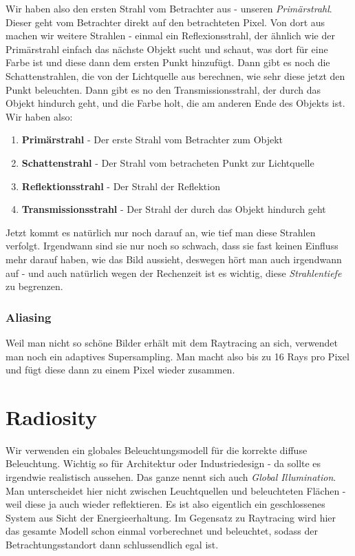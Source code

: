 Wir haben also den ersten Strahl vom Betrachter aus - unseren \textit{Primärstrahl}. Dieser geht vom Betrachter direkt auf den betrachteten Pixel. Von dort aus machen wir weitere Strahlen - einmal ein Reflexionsstrahl, der ähnlich wie der Primärstrahl einfach das nächste Objekt sucht und schaut, was dort für eine Farbe ist und diese dann dem ersten Punkt hinzufügt. Dann gibt es noch die Schattenstrahlen, die von der Lichtquelle aus berechnen, wie sehr diese jetzt den Punkt beleuchten. Dann gibt es no den Transmissionsstrahl, der durch das Objekt hindurch geht, und die Farbe holt, die am anderen Ende des Objekts ist. Wir haben also:
\begin{enumerate}
	\item \textbf{Primärstrahl} - Der erste Strahl vom Betrachter zum Objekt
	\item \textbf{Schattenstrahl} - Der Strahl vom betracheten Punkt zur Lichtquelle
	\item \textbf{Reflektionsstrahl} - Der Strahl der Reflektion
	\item \textbf{Transmissionsstrahl} - Der Strahl der durch das Objekt hindurch geht
\end{enumerate}

Jetzt kommt es natürlich nur noch darauf an, wie tief man diese Strahlen verfolgt. Irgendwann sind sie nur noch so schwach, dass sie fast keinen Einfluss mehr darauf haben, wie das Bild aussieht, deswegen hört man auch irgendwann auf - und auch natürlich wegen der Rechenzeit ist es wichtig, diese \textit{Strahlentiefe} zu begrenzen.

\subsection{Aliasing}
Weil man nicht so schöne Bilder erhält mit dem Raytracing an sich, verwendet man noch ein adaptives Supersampling. Man macht also bis zu 16 Rays pro Pixel und fügt diese dann zu einem Pixel wieder zusammen.

\chapter{Radiosity}
Wir verwenden ein globales Beleuchtungsmodell für die korrekte diffuse Beleuchtung. Wichtig so für Architektur oder Industriedesign - da sollte es irgendwie realistisch aussehen. Das ganze nennt sich auch \textit{Global Illumination}. Man unterscheidet hier nicht zwischen Leuchtquellen und beleuchteten Flächen - weil diese ja auch wieder reflektieren. Es ist also eigentlich ein geschlossenes System aus Sicht der Energieerhaltung. Im Gegensatz zu Raytracing wird hier das gesamte Modell schon einmal vorberechnet und beleuchtet, sodass der Betrachtungsstandort dann schlussendlich egal ist.
